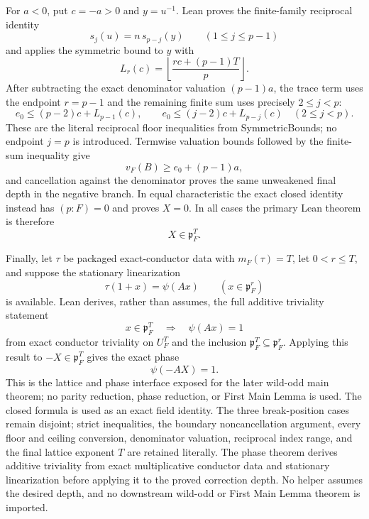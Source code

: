 \begin{theorem}
For $a<0$, put $c=-a>0$ and $y=u^{-1}$.  Lean proves the finite-family
reciprocal identity
\[
 s_j(u)=n\,s_{p-j}(y)\qquad(1\le j\le p-1)
\]
and applies the symmetric bound to $y$ with
\[
 L_r(c)=\left\lfloor\frac{rc+(p-1)T}{p}\right\rfloor.
\]
After subtracting the exact denominator valuation $(p-1)a$, the trace term
uses the endpoint $r=p-1$ and the remaining finite sum uses precisely
$2\le j<p$:
\[
 e_0\le(p-2)c+L_{p-1}(c),
\qquad
 e_0\le(j-2)c+L_{p-j}(c)\quad(2\le j<p).
\]
These are the literal reciprocal floor inequalities from SymmetricBounds;
no endpoint $j=p$ is introduced.  Termwise valuation bounds followed by
the finite-sum inequality give
\[
 v_F(B)\ge e_0+(p-1)a,
\]
and cancellation against the denominator proves the same unweakened final
depth in the negative branch.  In equal characteristic the exact closed
identity instead has $(p:F)=0$ and proves $X=0$.  In all cases the primary
Lean theorem is therefore
\[
 \boxed{\quad X\in\mathfrak p_F^T.\quad}
\]

Finally, let $\tau$ be packaged exact-conductor data with
$m_F(\tau)=T$, let $0<r\le T$, and suppose the stationary linearization
\[
 \tau(1+x)=\psi(Ax)\qquad(x\in\mathfrak p_F^r)
\]
is available.  Lean derives, rather than assumes, the full additive
triviality statement
\[
 x\in\mathfrak p_F^T\quad\Longrightarrow\quad\psi(Ax)=1
\]
from exact conductor triviality on $U_F^T$ and the inclusion
$\mathfrak p_F^T\subseteq\mathfrak p_F^r$.  Applying this result to
$-X\in\mathfrak p_F^T$ gives the exact phase
\[
 \boxed{\quad\psi(-AX)=1.\quad}
\]
This is the lattice and phase interface exposed for the later wild-odd
main theorem; no parity reduction, phase reduction, or First Main Lemma is
used.
\leanok
{}
\FormalizationContract The closed formula is used as an exact field
identity.  The three break-position cases remain disjoint; strict
inequalities, the boundary noncancellation argument, every floor and
ceiling conversion, denominator valuation, reciprocal index range, and
the final lattice exponent $T$ are retained literally.  The phase theorem
derives additive triviality from exact multiplicative conductor data and
stationary linearization before applying it to the proved correction
depth.  No helper assumes the desired depth, and no downstream wild-odd or
First Main Lemma theorem is imported.
\end{theorem}
